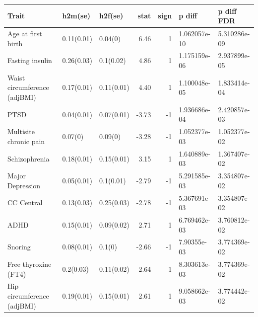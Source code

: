\begin{table}[ht]
\centering
\begin{tabular}{lllrrll}
  \hline
Trait & h2m(se) & h2f(se) & stat & sign & p diff & p diff FDR \\ 
  \hline
Age at first birth & 0.11(0.01) & 0.04(0) & 6.46 &   1 & 1.062057e-10 & 5.310286e-09 \\ 
  Fasting insulin & 0.26(0.03) & 0.1(0.02) & 4.86 &   1 & 1.175159e-06 & 2.937899e-05 \\ 
  Waist circumference (adjBMI) & 0.17(0.01) & 0.11(0.01) & 4.40 &   1 & 1.100048e-05 & 1.833414e-04 \\ 
  PTSD & 0.04(0.01) & 0.07(0.01) & -3.73 &  -1 & 1.936686e-04 & 2.420857e-03 \\ 
  Multisite chronic pain & 0.07(0) & 0.09(0) & -3.28 &  -1 & 1.052377e-03 & 1.052377e-02 \\ 
  Schizophrenia & 0.18(0.01) & 0.15(0.01) & 3.15 &   1 & 1.640889e-03 & 1.367407e-02 \\ 
  Major Depression & 0.05(0.01) & 0.1(0.01) & -2.79 &  -1 & 5.291585e-03 & 3.354807e-02 \\ 
  CC Central & 0.13(0.03) & 0.25(0.03) & -2.78 &  -1 & 5.367691e-03 & 3.354807e-02 \\ 
  ADHD & 0.15(0.01) & 0.09(0.02) & 2.71 &   1 & 6.769462e-03 & 3.760812e-02 \\ 
  Snoring & 0.08(0.01) & 0.1(0) & -2.66 &  -1 & 7.90355e-03 & 3.774369e-02 \\ 
  Free thyroxine (FT4) & 0.2(0.03) & 0.11(0.02) & 2.64 &   1 & 8.303613e-03 & 3.774369e-02 \\ 
  Hip circumference (adjBMI) & 0.19(0.01) & 0.15(0.01) & 2.61 &   1 & 9.058662e-03 & 3.774442e-02 \\ 
   \hline
\end{tabular}
\end{table}


